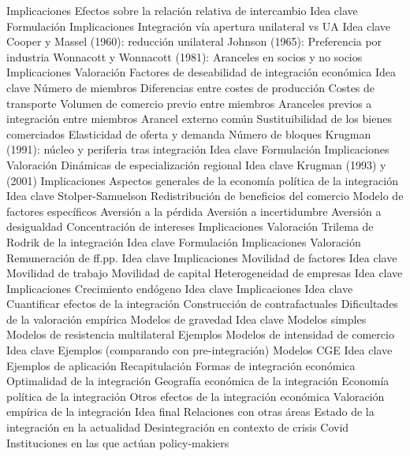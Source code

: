 \documentclass{nuevotema}
\begin{document}
\begin{esquema}[enumerate]
			\3 Implicaciones
		\2 Efectos sobre la relación relativa de intercambio
			\3 Idea clave
			\3 Formulación
			\3 Implicaciones
		\2 Integración vía apertura unilateral vs UA
			\3 Idea clave
			\3 Cooper y Massel (1960): reducción unilateral
			\3 Johnson (1965): Preferencia por industria
			\3 Wonnacott y Wonnacott (1981): Aranceles en socios y no socios
			\3 Implicaciones
			\3 Valoración
		\2 Factores de deseabilidad de integración económica
			\3 Idea clave
			\3 Número de miembros
			\3 Diferencias entre costes de producción
			\3 Costes de transporte
			\3 Volumen de comercio previo entre miembros
			\3 Aranceles previos a integración entre miembros
			\3 Arancel externo común
			\3 Sustituibilidad de los bienes comerciados
			\3 Elasticidad de oferta y demanda
			\3 Número de bloques
	\1 
		\2 Krugman (1991): núcleo y periferia tras integración
			\3 Idea clave
			\3 Formulación
			\3 Implicaciones
			\3 Valoración
		\2 Dinámicas de especialización regional
			\3 Idea clave
			\3 Krugman (1993) y (2001)
			\3 Implicaciones
	\1 
		\2 Aspectos generales de la economía política de la integración
			\3 Idea clave
			\3 Stolper-Samuelson
			\3 Redistribución de beneficios del comercio
			\3 Modelo de factores específicos
			\3 Aversión a la pérdida
			\3 Aversión a incertidumbre
			\3 Aversión a desigualdad
			\3 Concentración de intereses
			\3 Implicaciones
			\3 Valoración
		\2 Trilema de Rodrik de la integración
			\3 Idea clave
			\3 Formulación
			\3 Implicaciones
			\3 Valoración
	\1 
		\2 Remuneración de ff.pp.
			\3 Idea clave
			\3 Implicaciones
		\2 Movilidad de factores
			\3 Idea clave
			\3 Movilidad de trabajo
			\3 Movilidad de capital
		\2 Heterogeneidad de empresas
			\3 Idea clave
			\3 Implicaciones
		\2 Crecimiento endógeno
			\3 Idea clave
			\3 Implicaciones
	\1 
		\2 Idea clave
			\3 Cuantificar efectos de la integración
			\3 Construcción de contrafactuales
			\3 Dificultades de la valoración empírica
		\2 Modelos de gravedad
			\3 Idea clave
			\3 Modelos simples
			\3 Modelos de resistencia multilateral
			\3 Ejemplos
		\2 Modelos de intensidad de comercio
			\3 Idea clave
			\3 Ejemplos (comparando con pre-integración)
		\2 Modelos CGE
			\3 Idea clave
			\3 Ejemplos de aplicación
	\1[] 
		\2 Recapitulación
			\3 Formas de integración económica
			\3 Optimalidad de la integración
			\3 Geografía económica de la integración
			\3 Economía política de la integración
			\3 Otros efectos de la integración económica
			\3 Valoración empírica de la integración
		\2 Idea final
			\3 Relaciones con otras áreas
			\3 Estado de la integración en la actualidad
			\3 Desintegración en contexto de crisis Covid
			\3 Instituciones en las que actúan policy-makiers

\end{esquema}
\end{document}
